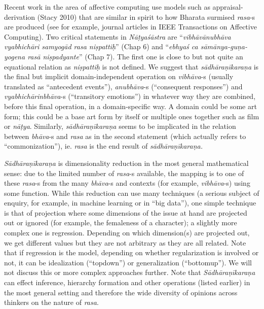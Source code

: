 Recent work in the area of affective computing use models such as appraisal-derivation (Stacy 2010) that are similar in spirit to how Bharata surmised \textsl{rasa}-s are produced (see for example, journal articles in IEEE Transactions on Affective Computing). Two critical statements in \textsl{Nāṭyaśāstra} are “\textsl{vibhāvānubhāva vyabhichāri samyogād rasa niṣpattiḥ}” (Chap 6) and “\textsl{ebhyaś ca sāmānya-guṇa-yogena rasā niṣpadyante}” (Chap 7). The first one is close to but not quite an equational relation as \textsl{niṣpattiḥ} is not defined. We suggest that \textsl{sādhāraṇīkaraṇa} is the final but implicit domain-independent operation on \textsl{vibhāva}-s (usually translated as “antecedent events”), \textsl{anubhāva}-s (“consequent responses”) and \textsl{vyabhichārinbhāva}-s (“transitory emotions”) in whatever way they are combined, before this final operation, in a domain-specific way. A domain could be some art form; this could be a base art form by itself or multiple ones together such as film or \textsl{nāṭya}. Similarly, \textsl{sādhāraṇīkaraṇa} seems to be implicated in the relation between \textsl{bhāva}-s and \textsl{rasa} as in the second statement (which actually refers to “commonization”), ie. \textsl{rasa} is the end result of \textsl{sādhāraṇīkaraṇa.}

\textsl{Sādhāraṇīkaraṇa} is dimensionality reduction in the most general mathematical sense: due to the limited number of \textsl{rasa}-s available, the mapping is to one of these \textsl{rasa}-s from the many \textsl{bhāva}-s and contexts (for example, \textsl{vibhāva}-s) using some function. While this reduction can use many techniques (a serious subject of enquiry, for example, in machine learning or in “big data”), one simple technique is that of projection where some dimensions of the issue at hand are projected out or ignored (for example, the femaleness of a character); a slightly more complex one is regression. Depending on which dimension(s) are projected out, we get different values but they are not arbitrary as they are all related. Note that if regression is the model, depending on whether regularization is involved or not, it can be idealization (“topdown”) or generalization (“bottomup”). We will not discuss this or more complex approaches further. Note that \textsl{Sādhāraṇīkaraṇa} can effect inference, hierarchy formation and other operations (listed earlier) in the most general setting and therefore the wide diversity of opinions across thinkers on the nature of \textsl{rasa}.


